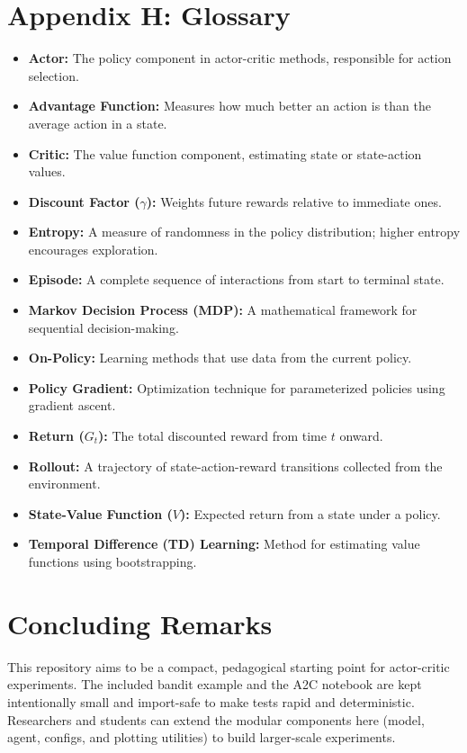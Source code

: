 \documentclass[11pt]{article}
\begin{document}
\section{Appendix H: Glossary}
\begin{itemize}
  \item \textbf{Actor:} The policy component in actor-critic methods, responsible for action selection.
  \item \textbf{Advantage Function:} Measures how much better an action is than the average action in a state.
  \item \textbf{Critic:} The value function component, estimating state or state-action values.
  \item \textbf{Discount Factor ($\gamma$):} Weights future rewards relative to immediate ones.
  \item \textbf{Entropy:} A measure of randomness in the policy distribution; higher entropy encourages exploration.
  \item \textbf{Episode:} A complete sequence of interactions from start to terminal state.
  \item \textbf{Markov Decision Process (MDP):} A mathematical framework for sequential decision-making.
  \item \textbf{On-Policy:} Learning methods that use data from the current policy.
  \item \textbf{Policy Gradient:} Optimization technique for parameterized policies using gradient ascent.
  \item \textbf{Return ($G_t$):} The total discounted reward from time $t$ onward.
  \item \textbf{Rollout:} A trajectory of state-action-reward transitions collected from the environment.
  \item \textbf{State-Value Function ($V$):} Expected return from a state under a policy.
  \item \textbf{Temporal Difference (TD) Learning:} Method for estimating value functions using bootstrapping.
\end{itemize}

\section{Concluding Remarks}
This repository aims to be a compact, pedagogical starting point for
actor-critic experiments. The included bandit example and the A2C notebook are
kept intentionally small and import-safe to make tests rapid and deterministic.
Researchers and students can extend the modular components here (model,
agent, configs, and plotting utilities) to build larger-scale experiments.
\end{document}
